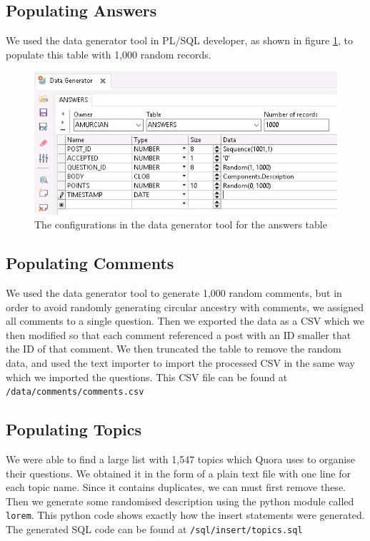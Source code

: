 \subsection{Populating Answers}

We used the data generator tool in PL/SQL developer, as shown in figure \ref{answers-generator}, to populate this table with 1,000 random records.

\begin{figure}[htbp]
	\centering
	\includegraphics[width=\linewidth]{images/answers_generator.jpeg}
	\caption{The configurations in the data generator tool for the answers table}
	\label{answers-generator}
\end{figure}

\subsection{Populating Comments}

We used the data generator tool to generate 1,000 random comments, but in order to avoid randomly generating circular ancestry with comments, we assigned all comments to a single question. Then we exported the data as a CSV which we then modified so that each comment referenced a post with an ID smaller that the ID of that comment. We then truncated the table to remove the random data, and used the text importer to import the processed CSV in the same way which we imported the questions. This CSV file can be found at \verb`/data/comments/comments.csv`

\subsection{Populating Topics}

We were able to find a large list with 1,547 topics which Quora uses to organise their questions. We obtained it in the form of a plain text file with one line for each topic name. Since it contains duplicates, we can must first remove these. Then we generate some randomised description using the python module called \verb`lorem`. This python code shows exactly how the insert statements were generated. The generated SQL code can be found at \verb`/sql/insert/topics.sql`

